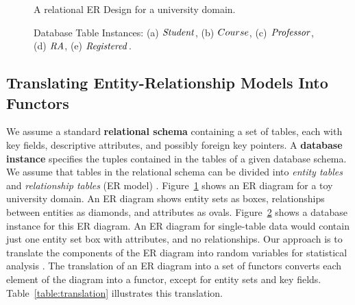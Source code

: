 \documentclass{acm_proc_article-sp}
\begin{document}
\begin{figure}[htbp] %
 \centering
{} 
\caption{A relational ER Design for a university domain.}
 \label{fig:university-schema}
\end{figure}


\begin{figure}[htbp] %
 \centering
{} 
\caption{Database Table Instances: (a) $\mathit{Student}$, (b) $Course$, (c) $\mathit{Professor}$, (d) $\mathit{RA}$, (e) $\mathit{Registered}$.  
}
 \label{fig:instance}
\end{figure}


\subsection{Translating Entity-Relationship Models Into Functors}
 We assume a standard \textbf{relational schema} containing a set of tables, each with key fields, %
descriptive attributes, and possibly foreign key pointers. 
A \textbf{database instance} specifies the tuples contained in the tables of a given database schema. 
We assume that tables in the relational schema can be divided into {\em entity tables} and {\em relationship tables} (ER model) \cite[Ch.2.2]{Ullman1982}.
 Figure~\ref{fig:university-schema} shows an ER diagram for a toy university domain. An ER diagram shows entity sets as boxes, relationships between entities as diamonds, and attributes as ovals. Figure~\ref{fig:instance} shows a database instance for this ER diagram. An ER diagram for single-table data would contain just one entity set box with attributes, and no relationships. Our approach is to translate the components of the ER diagram into random variables for statistical analysis \cite{Heckerman+al:SRL07}. The translation of an ER diagram into a set of functors converts each element of the diagram into a functor, except for entity sets and key fields. Table~\ref{table:translation} illustrates this translation.
\end{document}

